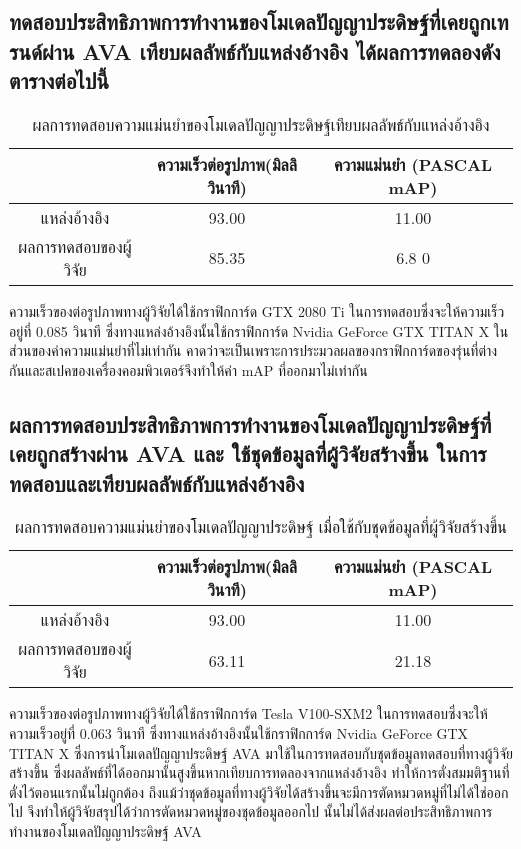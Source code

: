 \subsection{ทดสอบประสิทธิภาพการทำงานของโมเดลปัญญาประดิษฐ์ที่เคยถูกเทรนด์ผ่าน AVA เทียบผลลัพธ์กับแหล่งอ้างอิง ได้ผลการทดลองดังตารางต่อไปนี้}
\begin{table}[!ht]
	\centering
	\begin{tabular}{|c|c|c|}
			\hline
			{}&{ความเร็วต่อรูปภาพ(มิลลิวินาที)}&{ความแม่นยำ (PASCAL mAP)}			\\
			\hline
			แหล่งอ้างอิง	 					& 93.00		& 11.00				\\
			ผลการทดสอบของผู้วิจัย				& 85.35  		& 6.8	0				\\
			\hline
	\end{tabular}
\caption{ผลการทดสอบความแม่นยำของโมเดลปัญญาประดิษฐ์เทียบผลลัพธ์กับแหล่งอ้างอิง}
\label{tab: Compare PASCAL mAP with source}
\end{table}
ความเร็วของต่อรูปภาพทางผู้วิจัยได้ใช้กราฟิกการ์ด GTX 2080 Ti ในการทดสอบซึ่งจะให้ความเร็วอยู่ที่ 0.085 วินาที ซึ่งทางแหล่งอ้างอิงนั้นใช้กราฟิกการ์ด Nvidia GeForce GTX TITAN X 
ในส่วนของค่าความแม่นยำที่ไม่เท่ากัน คาดว่าจะเป็นเพราะการประมวลผลของกราฟิกการ์ดของรุ่นที่ต่างกันและสเปคของเครื่องคอมพิวเตอร์จึงทำให้ค่า mAP ที่ออกมาไม่เท่ากัน

\subsection{ผลการทดสอบประสิทธิภาพการทำงานของโมเดลปัญญาประดิษฐ์ที่เคยถูกสร้างผ่าน AVA และ ใช้ชุดข้อมูลที่ผู้วิจัยสร้างขึ้น ในการทดสอบและเทียบผลลัพธ์กับแหล่งอ้างอิง}
\begin{table}[!ht]
	\centering
	\begin{tabular}{|c|c|c|}
			\hline
			{}&{ความเร็วต่อรูปภาพ(มิลลิวินาที)}&{ความแม่นยำ (PASCAL mAP)}			\\
			\hline
			แหล่งอ้างอิง	 					& 93.00			& 11.00			\\
			ผลการทดสอบของผู้วิจัย				& 63.11			& 21.18			\\
			\hline
	\end{tabular}
\caption{ผลการทดสอบความแม่นยำของโมเดลปัญญาประดิษฐ์ เมื่อใช้กับชุดข้อมูลที่ผู้วิจัยสร้างขึ้น}
\label{tab: Compare PASCAL mAP with dataset created by the researcher}
\end{table}
ความเร็วของต่อรูปภาพทางผู้วิจัยได้ใช้กราฟิกการ์ด Tesla V100-SXM2 ในการทดสอบซึ่งจะให้ความเร็วอยู่ที่ 0.063 วินาที ซึ่งทางแหล่งอ้างอิงนั้นใช้กราฟิกการ์ด Nvidia GeForce GTX TITAN X ซึ่งการนำโมเดลปัญญาประดิษฐ์ AVA มาใช้ในการทดสอบกับชุดข้อมูลทดสอบที่ทางผู้วิจัยสร้างขึ้น ซึ่งผลลัพธ์ที่ได้ออกมานั้นสูงขึ้นหากเทียบการทดลองจากแหล่งอ้างอิง ทำให้การตั่งสมมติฐานที่ตั่งไว้ตอนแรกนั้นไม่ถูกต้อง ถึงแม้ว่าชุดข้อมูลที่ทางผู้วิจัยได้สร้างขึ้นจะมีการตัดหมวดหมู่ที่ไม่ได้ใช่ออกไป จึงทำให้ผู้วิจัยสรุปได้ว่าการตัดหมวดหมู่ของชุดข้อมูลออกไป นั้นไม่ได้ส่งผลต่อประสิทธิภาพการทำงานของโมเดลปัญญาประดิษฐ์ AVA

